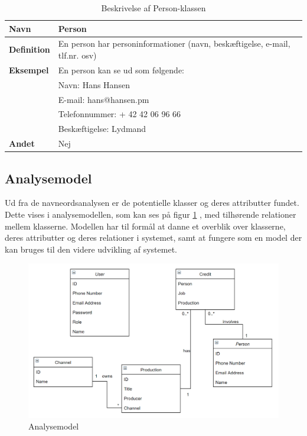 \begin{table}
    \centering
    \begin{tabular}{|p{6cm} | p{10cm} |}
        \hline
        \textbf{Navn} &  Person\\
        \hline
        \textbf{Definition} &  En person har personinformationer (navn, beskæftigelse, e-mail, tlf.nr. osv)\\
        \hline
        \textbf{Eksempel} & En person kan se ud som følgende: \\
                          & Navn: Hans Hansen\\
                          & E-mail: hans@hansen.pm\\
                          & Telefonnummer: + 42 42 06 96 66\\
                          & Beskæftigelse: Lydmand\\
        \hline
        \textbf{Andet} & Nej\\
        \hline
    \end{tabular}
    \caption{Beskrivelse af Person-klassen}
    \label{tab:person_class_description}
\end{table}

\subsection{Analysemodel}
Ud fra de navneordsanalysen er de potentielle klasser og deres attributter fundet. Dette vises i analysemodellen, som kan ses på figur \ref{fig:analysemodel} , med tilhørende relationer mellem klasserne. Modellen har til formål at danne et overblik over klasserne, deres attributter og deres relationer i systemet, samt at fungere som en model der kan bruges til den videre udvikling af systemet. \\


\begin{figure}[h]
\centering
\includegraphics[scale=0.43]{figures/analysemodel.png}
\caption{Analysemodel}
\label{fig:analysemodel}
\end{figure}

